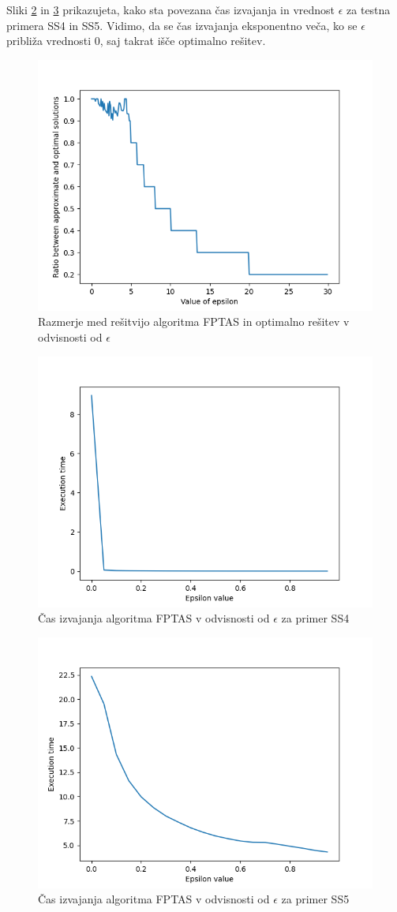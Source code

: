 \documentclass{article}
\begin{document}
Sliki \ref{fig:ss4} in \ref{fig:ss5} prikazujeta, kako sta povezana čas izvajanja
in vrednost $\epsilon$ za testna primera SS4 in SS5. Vidimo, da se čas izvajanja
eksponentno veča, ko se $\epsilon$ približa vrednosti 0, saj takrat išče
optimalno rešitev.

\begin{figure}
	\centering
	\includegraphics[width=0.8\linewidth]{figs/fptas-bad.png}
	\caption{Razmerje med rešitvijo algoritma FPTAS in optimalno rešitev v odvisnosti od $\epsilon$}
	\label{fig:fptas}
\end{figure}

\begin{figure}
	\centering
	\includegraphics[width=0.8\linewidth]{figs/ss4.png}
	\caption{Čas izvajanja algoritma FPTAS v odvisnosti od $\epsilon$ za primer SS4}
	\label{fig:ss4}
\end{figure}

\begin{figure}
	\centering
	\includegraphics[width=0.8\linewidth]{figs/ss5.png}
	\caption{Čas izvajanja algoritma FPTAS v odvisnosti od $\epsilon$ za primer SS5}
	\label{fig:ss5}
\end{figure}
\end{document}
